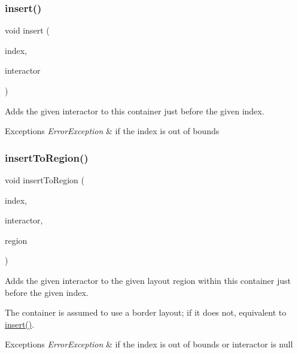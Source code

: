 \subsubsection{\texorpdfstring{insert()}{insert()}\hspace{0.1cm}{\footnotesize\ttfamily [2/2]}}
{\footnotesize\ttfamily void insert (\begin{DoxyParamCaption}\item[{int}]{index,  }\item[{\mbox{\hyperlink{classGInteractor}{G\+Interactor}} \&}]{interactor }\end{DoxyParamCaption})\hspace{0.3cm}{\ttfamily [virtual]}}



Adds the given interactor to this container just before the given index. 


\begin{DoxyExceptions}{Exceptions}
{\em Error\+Exception} & if the index is out of bounds \\
\hline
\end{DoxyExceptions}
\mbox{\label{classGContainer_a1c4b766b059991ad7d084ea03f22f1c5}} 
\subsubsection{\texorpdfstring{insert\+To\+Region()}{insertToRegion()}\hspace{0.1cm}{\footnotesize\ttfamily [1/4]}}
{\footnotesize\ttfamily void insert\+To\+Region (\begin{DoxyParamCaption}\item[{int}]{index,  }\item[{\mbox{\hyperlink{classGInteractor}{G\+Interactor}} $\ast$}]{interactor,  }\item[{\mbox{\hyperlink{classGContainer_a81a01a86de31071a92e6cce0bab9bc4b}{Region}}}]{region }\end{DoxyParamCaption})\hspace{0.3cm}{\ttfamily [virtual]}}



Adds the given interactor to the given layout region within this container just before the given index. 

The container is assumed to use a border layout; if it does not, equivalent to \mbox{\hyperlink{classGContainer_afffb8f789ff9a8466fbae5b846a0ebe7}{insert()}}. 
\begin{DoxyExceptions}{Exceptions}
{\em Error\+Exception} & if the index is out of bounds or interactor is null \\
\hline
\end{DoxyExceptions}
\mbox{\label{classGContainer_adeeb03feb9346a9cf2046427484c20bc}} 
